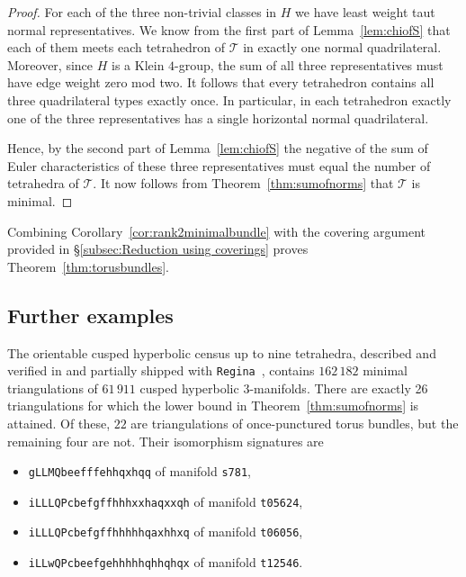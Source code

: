 \documentclass[a4paper]{gtart}
\def\tri{\mathcal{T}}
\theoremstyle{plain}
\theoremstyle{definition}
\theoremstyle{remark}
\numberwithin{equation}{section}
\begin{document}
\begin{proof}
  For each of the three non-trivial classes in $H$ we have least weight taut normal representatives. 
  We know from the first part of Lemma~\ref{lem:chiofS} that each of them meets each tetrahedron of $\tri$ in exactly one normal
  quadrilateral. Moreover, since $H$ is a Klein $4$-group, the sum of all three representatives
  must have edge weight zero mod two. It follows that every tetrahedron contains all three quadrilateral
  types exactly once. In particular, in each tetrahedron exactly one of the three representatives has a 
  single horizontal normal quadrilateral. 

  Hence, by the second part of Lemma~\ref{lem:chiofS} the negative of the sum of Euler characteristics of these three representatives must equal the number of tetrahedra of $\tri.$
  It now follows from Theorem~\ref{thm:sumofnorms} that $\tri$ is minimal. 
\end{proof} 

Combining Corollary~\ref{cor:rank2minimalbundle} with the covering argument provided in \S\ref{subsec:Reduction using coverings} proves Theorem~\ref{thm:torusbundles}.


\subsection{Further examples}
\label{subsec:more examples}

The orientable cusped hyperbolic census up to nine tetrahedra, described and verified in \cite{Burton14Census} and partially shipped with \texttt{Regina}~\cite{regina}, contains $162\,182$ minimal triangulations of $61\,911$ cusped hyperbolic $3$-manifolds. There are exactly 26 triangulations for which the lower bound in Theorem~\ref{thm:sumofnorms} is attained. Of these, $22$ are triangulations of once-punctured torus bundles, but the remaining four are not. Their isomorphism signatures are 
\begin{itemize}
  \item \texttt{gLLMQbeefffehhqxhqq} of manifold \texttt{s781}, 
  \item \texttt{iLLLQPcbefgffhhhxxhaqxxqh} of manifold \texttt{t05624},
  \item \texttt{iLLLQPcbefgffhhhhhqaxhhxq} of manifold \texttt{t06056},
  \item \texttt{iLLwQPcbeefgehhhhhqhhqhqx} of manifold \texttt{t12546}.
\end{itemize}
\end{document}
